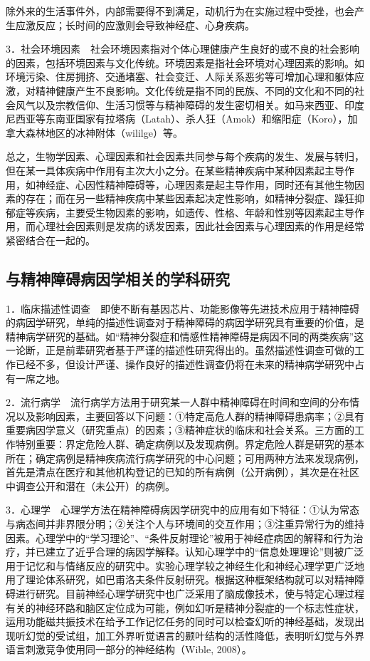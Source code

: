 除外来的生活事件外，内部需要得不到满足，动机行为在实施过程中受挫，也会产生应激反应；长时间的应激则会导致神经症、心身疾病。

3．社会环境因素　社会环境因素指对个体心理健康产生良好的或不良的社会影响的因素，包括环境因素与文化传统。环境因素是指社会环境对心理因素的影响。如环境污染、住房拥挤、交通堵塞、社会变迁、人际关系恶劣等可增加心理和躯体应激，对精神健康产生不良影响。文化传统是指不同的民族、不同的文化和不同的社会风气以及宗教信仰、生活习惯等与精神障碍的发生密切相关。如马来西亚、印度尼西亚等东南亚国家有拉塔病（Latah）、杀人狂（Amok）和缩阳症（Koro），加拿大森林地区的冰神附体（wililge）等。

总之，生物学因素、心理因素和社会因素共同参与每个疾病的发生、发展与转归，但在某一具体疾病中作用有主次大小之分。在某些精神疾病中某种因素起主导作用，如神经症、心因性精神障碍等，心理因素是起主导作用，同时还有其他生物因素的存在；而在另一些精神疾病中某些因素起决定性影响，如精神分裂症、躁狂抑郁症等疾病，主要受生物因素的影响，如遗传、性格、年龄和性别等因素起主导作用，而心理社会因素则是发病的诱发因素，因此社会因素与心理因素的作用是经常紧密结合在一起的。

\subsection{与精神障碍病因学相关的学科研究}

1．临床描述性调查　即使不断有基因芯片、功能影像等先进技术应用于精神障碍的病因学研究，单纯的描述性调查对于精神障碍的病因学研究具有重要的价值，是精神病学研究的基础。如``精神分裂症和情感性精神障碍是病因不同的两类疾病''这一论断，正是前辈研究者基于严谨的描述性研究得出的。虽然描述性调查可做的工作已经不多，但设计严谨、操作良好的描述性调查仍将在未来的精神病学研究中占有一席之地。

2．流行病学　流行病学方法用于研究某一人群中精神障碍在时间和空间的分布情况以及影响因素，主要回答以下问题：①特定高危人群的精神障碍患病率；②具有重要病因学意义（研究重点）的因素；③精神症状的临床和社会关系。三方面的工作特别重要：界定危险人群、确定病例以及发现病例。界定危险人群是研究的基本所在；确定病例是精神疾病流行病学研究的中心问题；可用两种方法来发现病例，首先是清点在医疗和其他机构登记的已知的所有病例（公开病例），其次是在社区中调查公开和潜在（未公开）的病例。

3．心理学　心理学方法在精神障碍病因学研究中的应用有如下特征：①认为常态与病态间并非界限分明；②关注个人与环境间的交互作用；③注重异常行为的维持因素。心理学中的``学习理论''、``条件反射理论''被用于神经症病因的解释和行为治疗，并已建立了近乎合理的病因学解释。认知心理学中的``信息处理理论''则被广泛用于记忆和与情绪反应的研究中。实验心理学较之神经生化和神经心理学更广泛地用了理论体系研究，如巴甫洛夫条件反射研究。根据这种框架结构就可以对精神障碍进行研究。目前神经心理学研究中也广泛采用了脑成像技术，使与特定心理过程有关的神经环路和脑区定位成为可能，例如幻听是精神分裂症的一个标志性症状，运用功能磁共振技术在给予工作记忆任务的同时可以检查幻听的神经基础，发现出现听幻觉的受试组，加工外界听觉语言的颞叶结构的活性降低，表明听幻觉与外界语言刺激竞争使用同一部分的神经结构（Wible,
2008）。

